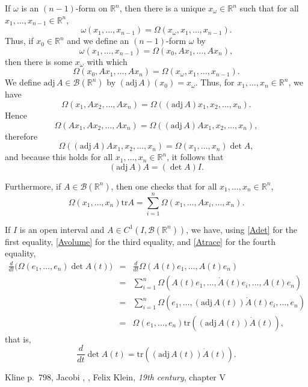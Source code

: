 \documentclass{article}
\newcommand{\tr}{\textrm{tr}}
\newcommand{\adj}{\mathrm{adj}\,}
\theoremstyle{definition}
\begin{document}
If $\omega$ is an $(n-1)$-form on $\mathbb{R}^n$, then there is a unique $x_\omega \in \mathbb{R}^n$ such that for all
$x_1,\ldots,x_{n-1} \in \mathbb{R}^n$,
\[
\omega(x_1,\ldots,x_{n-1}) = \Omega(x_\omega,x_1,\ldots,x_{n-1}).
\]
Thus, if $x_0 \in \mathbb{R}^n$ and we define an $(n-1)$-form $\omega$ by
\[
\omega(x_1,\ldots,x_{n-1}) = \Omega(x_0,Ax_1,\ldots,Ax_n),
\]
then there is some $x_\omega$ with which
\[
\Omega(x_0,Ax_1,\ldots,Ax_n)=\Omega(x_\omega,x_1,\ldots,x_{n-1}).
\]
We define $\adj A \in \mathscr{B}(\mathbb{R}^n)$ by $(\adj A)(x_0)=x_\omega$.
Thus, for $x_1,\ldots,x_n \in \mathbb{R}^n$, we have
\begin{equation}
\Omega(x_1,Ax_2,\ldots,Ax_n)=\Omega((\adj A)x_1,x_2,\ldots,x_n).
\label{Avolume}
\end{equation}
Hence
\[
\Omega(Ax_1,Ax_2,\ldots,Ax_n) = \Omega((\adj A)Ax_1,x_2,\ldots,x_n),
\]
 therefore
\[
\Omega((\adj A)Ax_1,x_2,\ldots,x_n) = \Omega(x_1,\ldots,x_n) \det A,
\]
and because this holds for all $x_1,\ldots,x_n \in \mathbb{R}^n$, it follows that
\[
(\adj A) A = (\det A)I.
\]

Furthermore, if $A \in \mathscr{B}(\mathbb{R}^n)$, then one checks that for all $x_1,\ldots,x_n \in \mathbb{R}^n$,
\begin{equation}
\Omega(x_1,\ldots,x_n) \tr A = \sum_{i=1}^n \Omega(x_1,\ldots,Ax_i,\ldots,x_n).
\label{Atrace}
\end{equation}

If $I$ is an open interval and $A \in C^1(I,\mathscr{B}(\mathbb{R}^n))$, we have, using \eqref{Adet} for the first equality,
 \eqref{Avolume} for the third equality, and \eqref{Atrace} for the fourth
equality,
\begin{eqnarray*}
\frac{d}{dt}\Big( \Omega(e_1,\ldots,e_n) \det A(t) \Big)&=&\frac{d}{dt}\Omega(A(t)e_1,\ldots,A(t)e_n)\\
&=&\sum_{i=1}^n \Omega(A(t)e_1,\ldots,\dot{A}(t)e_i,\ldots,A(t)e_n)\\
&=&\sum_{i=1}^n \Omega(e_1,\ldots,(\adj A(t))\dot{A}(t)e_i,\ldots,e_n)\\
&=&\Omega(e_1,\ldots,e_n) \tr( (\adj A(t)) \dot{A}(t)),
\end{eqnarray*}
that is,
\[
\frac{d}{dt} \det A(t) =  \tr( (\adj A(t)) \dot{A}(t)).
\]


Kline p.~798, Jacobi \cite{jacobi1841a}, \cite[\S 17]{jacobi1845}, Felix Klein, {\em 19th century}, chapter V
\end{document}
